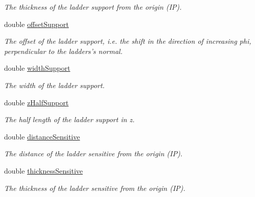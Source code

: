 \begin{DoxyCompactItemize}
\begin{DoxyCompactList}\small\item\em The thickness of the ladder support from the origin (IP). \item\end{DoxyCompactList}\item 
double \hyperlink{struct_d_d4hep_1_1_d_d_rec_1_1_z_planar_struct_1_1_layer_layout_ae19dff80b6c19640638709b1030f966e}{offsetSupport}
\begin{DoxyCompactList}\small\item\em The offset of the ladder support, i.e. the shift in the direction of increasing phi, perpendicular to the ladders's normal. \item\end{DoxyCompactList}\item 
double \hyperlink{struct_d_d4hep_1_1_d_d_rec_1_1_z_planar_struct_1_1_layer_layout_a424a9c4bbadfd8837f8f470ae48b2c61}{widthSupport}
\begin{DoxyCompactList}\small\item\em The width of the ladder support. \item\end{DoxyCompactList}\item 
double \hyperlink{struct_d_d4hep_1_1_d_d_rec_1_1_z_planar_struct_1_1_layer_layout_abc36f1593bf58e3ccae337babd8be4d5}{zHalfSupport}
\begin{DoxyCompactList}\small\item\em The half length of the ladder support in z. \item\end{DoxyCompactList}\item 
double \hyperlink{struct_d_d4hep_1_1_d_d_rec_1_1_z_planar_struct_1_1_layer_layout_a3bff9db37d2d2cb49055c2bd59c69ebd}{distanceSensitive}
\begin{DoxyCompactList}\small\item\em The distance of the ladder sensitive from the origin (IP). \item\end{DoxyCompactList}\item 
double \hyperlink{struct_d_d4hep_1_1_d_d_rec_1_1_z_planar_struct_1_1_layer_layout_a892de05e4a65f7fcd96493f7e24f060d}{thicknessSensitive}
\begin{DoxyCompactList}\small\item\em The thickness of the ladder sensitive from the origin (IP). \item\end{DoxyCompactList}\item 

\end{DoxyCompactItemize}
